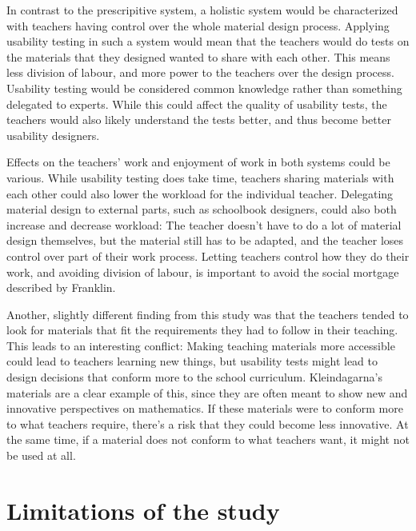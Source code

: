In contrast to the prescripitive system, a holistic system would be characterized with teachers having control over the whole material design process. Applying usability testing in such a system would mean that the teachers would do tests on the materials that they designed wanted to share with each other. This means less division of labour, and more power to the teachers over the design process. Usability testing would be considered common knowledge rather than something delegated to experts. While this could affect the quality of usability tests, the teachers would also likely understand the tests better, and thus become better usability designers.

Effects on the teachers' work and enjoyment of work in both systems could be various. While usability testing does take time, teachers sharing materials with each other could also lower the workload for the individual teacher. Delegating material design to external parts, such as schoolbook designers, could also both increase and decrease workload: The teacher doesn't have to do a lot of material design themselves, but the material still has to be adapted, and the teacher loses control over part of their work process. Letting teachers control how they do their work, and avoiding division of labour, is important to avoid the social mortgage described by Franklin.

Another, slightly different finding from this study was that the teachers tended to look for materials that fit the requirements they had to follow in their teaching. This leads to an interesting conflict: Making teaching materials more accessible could lead to teachers learning new things, but usability tests might lead to design decisions that conform more to the school curriculum. Kleindagarna's materials are a clear example of this, since they are often meant to show new and innovative perspectives on mathematics. If these materials were to conform more to what teachers require, there's a risk that they could become less innovative. At the same time, if a material does not conform to what teachers want, it might not be used at all.

\section{Limitations of the study}
